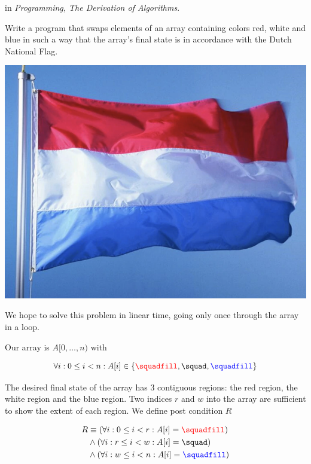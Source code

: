 
 in \textit{Programming, The Derivation of Algorithms}\cite{Kaldewaij90}.

\vspace{10 mm}
\begin{problem}
Write a program that swaps elements of an array containing colors red, white and blue in such a way that the array's final state is in accordance with the Dutch National Flag. 
\end{problem}

\begin{marginfigure}
\includegraphics[scale=0.30]{flag.png}
\end{marginfigure}

We hope to solve this problem in linear time, going only once through the array in a loop. 


Our array is $A[0,\ldots,n)$ with 

$$
\forall i: 0 \leq i < n: A[i] \in \{ {\color{red} \squadfill}, \squad,  {\color{blue} \squadfill} \}
$$


The desired final state of the array has 3 contiguous regions: the red region, the white region and the blue region. Two indices $r$ and $w$ into the array are sufficient to show the extent of each region. We define post condition $R$

\begin{align*}
R & \equiv (\forall i: 0 \leq i < r: A[i] = {\color{red} \squadfill}) \\
  & \wedge (\forall i: r \leq i < w: A[i] = \squad) \\
  & \wedge (\forall i: w \leq i < n: A[i] = {\color{blue} \squadfill})
\end{align*}


